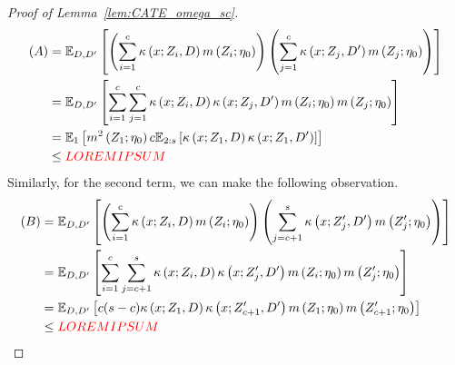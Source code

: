 \begin{proof}[Proof of Lemma~\ref{lem:CATE_omega_sc}]
\begin{equation}
\begin{aligned}
            (A)
            & = \mathbb{E}_{D, D^{\prime}}\left[\left(\sum_{i = 1}^{c} \kappa\left(x; Z_{i}, D\right) m\left(Z_{i}; \eta_{0}\right)\right)
            \left(\sum_{j = 1}^{c} \kappa\left(x; Z_{j}, D^{\prime}\right) m\left(Z_{j}; \eta_{0}\right)\right)\right] \\
			& = \mathbb{E}_{D, D^{\prime}}\left[
				\sum_{i = 1}^{c} \sum_{j = 1}^{c} \kappa\left(x; Z_{i}, D\right)\kappa\left(x; Z_{j}, D^{\prime}\right) m\left(Z_{i}; \eta_{0}\right)m\left(Z_{j}; \eta_{0}\right)
			\right] \\
			& = \mathbb{E}_{1}\left[m^{2}\left(Z_{1}; \eta_{0}\right) c \mathbb{E}_{2:s}\left[\kappa\left(x; Z_{1}, D\right)\kappa\left(x; Z_{1}, D^{\prime}\right)\right]\right]\\
            & \leq {\color{red} LOREM IPSUM}
        \end{aligned}
    \end{equation}
	Similarly, for the second term, we can make the following observation.
	\begin{equation}
		\begin{aligned}
			(B) 
			& = \mathbb{E}_{D, D^{\prime}}\left[\left(\sum_{i = 1}^{c} \kappa\left(x; Z_{i}, D\right) m\left(Z_{i}; \eta_{0}\right)\right)
            \left(\sum_{j = c + 1}^{s} \kappa\left(x; Z_{j}^{\prime}, D^{\prime}\right) m\left(Z_{j}^{\prime}; \eta_{0}\right)\right)\right] \\
			& = \mathbb{E}_{D,D^{\prime}}\left[\sum_{i = 1}^{c} \sum_{j = c + 1}^{s}\kappa\left(x; Z_{i}, D\right)\kappa\left(x; Z_{j}^{\prime}, D^{\prime}\right) 
			m\left(Z_{i}; \eta_{0}\right)m\left(Z_{j}^{\prime}; \eta_{0}\right)\right]\\
			& = \mathbb{E}_{D, D^{\prime}}\left[c (s-c) \kappa\left(x; Z_{1}, D\right)\kappa\left(x; Z_{c+1}^{\prime}, D^{\prime}\right) 
			m\left(Z_{1}; \eta_{0}\right) m\left(Z_{c+1}^{\prime}; \eta_{0}\right)\right]\\
			& \leq {\color{red} LOREM IPSUM}
		\end{aligned}
	\end{equation}

\end{proof}
